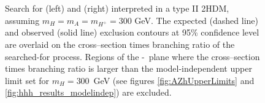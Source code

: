\begin{figure}[h!]
\begin{center}
\caption{Search for \Htohhtobbtautau (left) and \AtoZhtolltautau (right) interpreted in a type II 
2HDM, assuming $m_{H} = m_{A} = m_{H^{+}} = 300$ GeV. The expected (dashed line)
and observed (solid line) exclusion contours at 95\% confidence level are overlaid
on the cross--section times branching ratio of the searched-for process.
Regions of the \cosba-\tanb~plane where the cross--section times branching
ratio is larger than the model-independent upper limit set for $m_{H} = 300 $~GeV 
(see figures \ref{fig:AZhUpperLimits} and \ref{fig:hhh_results_modelindep}) are excluded.}
\label{fig:HhhandAZh2HDMOverlaid}
\end{center}
\end{figure}


